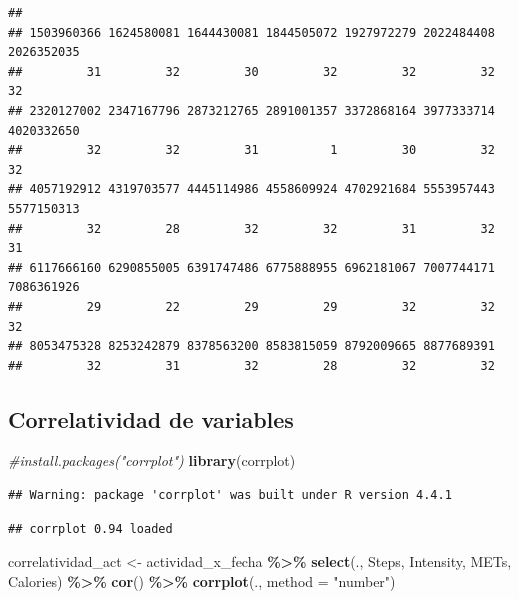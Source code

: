 \documentclass[
]{article}
\newenvironment{Shaded}{\begin{snugshade}}{\end{snugshade}}
\newcommand{\AttributeTok}[1]{\textcolor[rgb]{0.13,0.29,0.53}{#1}}
\newcommand{\CommentTok}[1]{\textcolor[rgb]{0.56,0.35,0.01}{\textit{#1}}}
\newcommand{\FunctionTok}[1]{\textcolor[rgb]{0.13,0.29,0.53}{\textbf{#1}}}
\newcommand{\NormalTok}[1]{#1}
\newcommand{\OtherTok}[1]{\textcolor[rgb]{0.56,0.35,0.01}{#1}}
\newcommand{\SpecialCharTok}[1]{\textcolor[rgb]{0.81,0.36,0.00}{\textbf{#1}}}
\newcommand{\StringTok}[1]{\textcolor[rgb]{0.31,0.60,0.02}{#1}}
\begin{document}
\begin{verbatim}
## 
## 1503960366 1624580081 1644430081 1844505072 1927972279 2022484408 2026352035 
##         31         32         30         32         32         32         32 
## 2320127002 2347167796 2873212765 2891001357 3372868164 3977333714 4020332650 
##         32         32         31          1         30         32         32 
## 4057192912 4319703577 4445114986 4558609924 4702921684 5553957443 5577150313 
##         32         28         32         32         31         32         31 
## 6117666160 6290855005 6391747486 6775888955 6962181067 7007744171 7086361926 
##         29         22         29         29         32         32         32 
## 8053475328 8253242879 8378563200 8583815059 8792009665 8877689391 
##         32         31         32         28         32         32
\end{verbatim}

\subsection{Correlatividad de
variables}\label{correlatividad-de-variables}

\begin{Shaded}
\begin{Highlighting}[]
\CommentTok{\#install.packages("corrplot")}
\FunctionTok{library}\NormalTok{(corrplot)}
\end{Highlighting}
\end{Shaded}

\begin{verbatim}
## Warning: package 'corrplot' was built under R version 4.4.1
\end{verbatim}

\begin{verbatim}
## corrplot 0.94 loaded
\end{verbatim}

\begin{Shaded}
\begin{Highlighting}[]
\NormalTok{correlatividad\_act }\OtherTok{\textless{}{-}}\NormalTok{ actividad\_x\_fecha }\SpecialCharTok{\%\textgreater{}\%} \FunctionTok{select}\NormalTok{(., Steps, Intensity, METs, Calories) }\SpecialCharTok{\%\textgreater{}\%} \FunctionTok{cor}\NormalTok{() }\SpecialCharTok{\%\textgreater{}\%} \FunctionTok{corrplot}\NormalTok{(., }\AttributeTok{method =} \StringTok{"number"}\NormalTok{)}
\end{Highlighting}
\end{Shaded}
\end{document}
